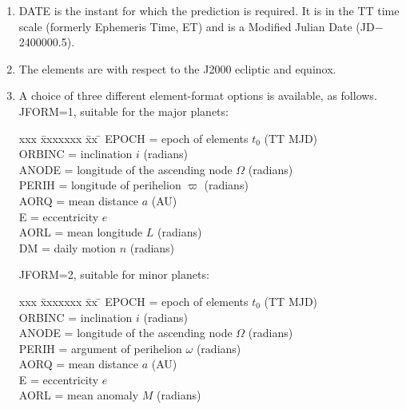 \documentclass[11pt,twoside]{article}
\begin{document}
{
 \begin{enumerate}
  \item DATE is the instant for which the prediction is required.  It is
        in the TT time scale (formerly Ephemeris Time, ET) and is a
        Modified Julian Date (JD$-$2400000.5).
  \item The elements are with respect to the J2000 ecliptic and equinox.
  \item A choice of three different element-format options is available, as
        follows. \\

        JFORM=1, suitable for the major planets:

        \begin{tabbing}
        xxx \= xxxxxxx \= xx \= \kill
        \> EPOCH  \> = \> epoch of elements $t_0$ (TT MJD) \\
        \> ORBINC \> = \> inclination $i$ (radians) \\
        \> ANODE  \> = \> longitude of the ascending node $\Omega$ (radians) \\
        \> PERIH  \> = \> longitude of perihelion $\varpi$ (radians) \\
        \> AORQ   \> = \> mean distance $a$ (AU) \\
        \> E      \> = \> eccentricity $e$ \\
        \> AORL   \> = \> mean longitude $L$ (radians) \\
        \> DM     \> = \> daily motion $n$ (radians)
        \end{tabbing}

        JFORM=2, suitable for minor planets:

        \begin{tabbing}
        xxx \= xxxxxxx \= xx \= \kill
        \> EPOCH  \> = \> epoch of elements $t_0$ (TT MJD) \\
        \> ORBINC \> = \> inclination $i$ (radians) \\
        \> ANODE  \> = \> longitude of the ascending node $\Omega$ (radians) \\
        \> PERIH  \> = \> argument of perihelion $\omega$ (radians) \\
        \> AORQ   \> = \> mean distance $a$ (AU) \\
        \> E      \> = \> eccentricity $e$ \\
        \> AORL   \> = \> mean anomaly $M$ (radians)
        \end{tabbing}


\end{enumerate}}
\end{document}
